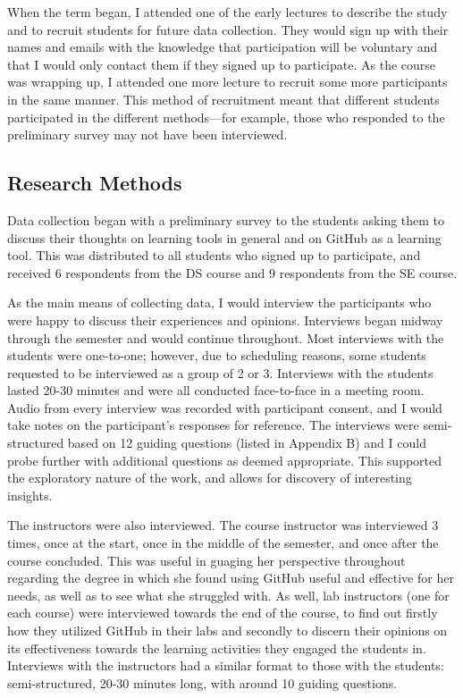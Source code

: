 When the term began, I attended one of the early lectures to describe the study and to recruit students for future data collection. They would sign up with their names and emails with the knowledge that participation will be voluntary and that I would only contact them if they signed up to participate. As the course was wrapping up, I attended one more lecture to recruit some more participants in the same manner. This method of recruitment meant that different students participated in the different methods---for example, those who responded to the preliminary survey may not have been interviewed.

\subsection{Research Methods}
Data collection began with a preliminary survey to the students asking them to discuss their thoughts on learning tools in general and on GitHub as a learning tool. This was distributed to all students who signed up to participate, and received 6 respondents from the DS course and 9 respondents from the SE course.

As the main means of collecting data, I would interview the participants who were happy to discuss their experiences and opinions. Interviews began midway through the semester and would continue throughout. Most interviews with the students were one-to-one; however, due to scheduling reasons, some students requested to be interviewed as a group of 2 or 3. Interviews with the students lasted 20-30 minutes and were all conducted face-to-face in a meeting room. Audio from every interview was recorded with participant consent, and I would take notes on the participant's responses for reference. The interviews were semi-structured based on 12 guiding questions (listed in Appendix B) and I could probe further with additional questions as deemed appropriate. This supported the exploratory nature of the work, and allows for discovery of interesting insights.

The instructors were also interviewed. The course instructor was interviewed 3 times, once at the start, once in the middle of the semester, and once after the course concluded. This was useful in guaging her perspective throughout regarding the degree in which she found using GitHub useful and effective for her needs, as well as to see what she struggled with. As well, lab instructors (one for each course) were interviewed towards the end of the course, to find out firstly how they utilized GitHub in their labs and secondly to discern their opinions on its effectiveness towards the learning activities they engaged the students in. Interviews with the instructors had a similar format to those with the students: semi-structured, 20-30 minutes long, with around 10 guiding questions.

